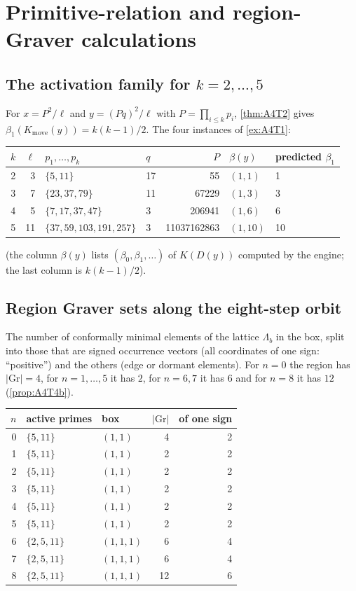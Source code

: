 \section{Primitive-relation and region-Graver calculations}\label{app:relations}
\subsection{The activation family for \texorpdfstring{$k=2,\dots,5$}{k=2..5}}
For $x=P^2/\ell$ and $y=(Pq)^2/\ell$ with $P=\prod_{i\le k}p_i$, \cref{thm:A4T2} gives $\beta_1(K_{\mathrm{move}}(y))=k(k-1)/2$. The four instances of \cref{ex:A4T1}:
\begin{center}\small\begin{tabular}{@{}rrllrll@{}}\toprule
$k$ & $\ell$ & $p_1,\dots,p_k$ & $q$ & $P$ & $\beta(y)$ & predicted $\beta_1$\\\midrule
2 & 3 & $\{5,11\}$ & 17 & 55 & $(1,1)$ & 1\\
3 & 7 & $\{23,37,79\}$ & 11 & 67229 & $(1,3)$ & 3\\
4 & 5 & $\{7,17,37,47\}$ & 3 & 206941 & $(1,6)$ & 6\\
5 & 11 & $\{37,59,103,191,257\}$ & 3 & 11037162863 & $(1,10)$ & 10\\
\bottomrule\end{tabular}\end{center}
(the column $\beta(y)$ lists $(\beta_0,\beta_1,\dots)$ of $K(D(y))$ computed by the engine; the last column is $k(k-1)/2$).
\subsection{Region Graver sets along the eight-step orbit}
The number of conformally minimal elements of the lattice $\Lambda_b$ in the box, split into those that are signed occurrence vectors (all coordinates of one sign: ``positive'') and the others (edge or dormant elements). For $n=0$ the region has $|\mathrm{Gr}|=4$, for $n=1,\dots,5$ it has $2$, for $n=6,7$ it has $6$ and for $n=8$ it has $12$ (\cref{prop:A4T4b}).
\begin{center}\small\begin{tabular}{@{}rllrr@{}}\toprule
$n$ & active primes & box & $|\mathrm{Gr}|$ & of one sign\\\midrule
0 & $\{5,11\}$ & $(1,1)$ & 4 & 2\\
1 & $\{5,11\}$ & $(1,1)$ & 2 & 2\\
2 & $\{5,11\}$ & $(1,1)$ & 2 & 2\\
3 & $\{5,11\}$ & $(1,1)$ & 2 & 2\\
4 & $\{5,11\}$ & $(1,1)$ & 2 & 2\\
5 & $\{5,11\}$ & $(1,1)$ & 2 & 2\\
6 & $\{2,5,11\}$ & $(1,1,1)$ & 6 & 4\\
7 & $\{2,5,11\}$ & $(1,1,1)$ & 6 & 4\\
8 & $\{2,5,11\}$ & $(1,1,1)$ & 12 & 6\\
\bottomrule\end{tabular}\end{center}
